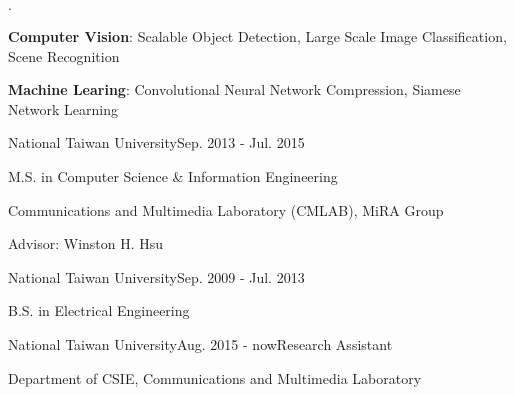 \documentclass{joel_cv}
\begin{document}
\begin{cvHeader} 
\end{cvHeader}

%
%

\begin{sectionItemize}{$\cdot$}
	\item \textbf{Computer Vision}: Scalable Object Detection, Large Scale Image Classification, Scene Recognition
	\item \textbf{Machine Learing}: Convolutional Neural Network Compression, Siamese Network Learning
\end{sectionItemize}

%
%

\begin{sectionContentSimple}{National Taiwan University}{Sep. 2013 - Jul. 2015}
	\item M.S. in Computer Science \& Information Engineering
	\item Communications and Multimedia Laboratory (CMLAB), MiRA Group
	\item Advisor: Winston H. Hsu
\end{sectionContentSimple}

\begin{sectionContentSimple}{National Taiwan University}{Sep. 2009 - Jul. 2013}
	\item B.S. in Electrical Engineering
\end{sectionContentSimple}


%
%


\begin{sectionContentNormal}{National Taiwan University}{Aug. 2015 - now}{Research Assistant}
	\item Department of CSIE, Communications and Multimedia Laboratory
\end{sectionContentNormal}
\end{document}
